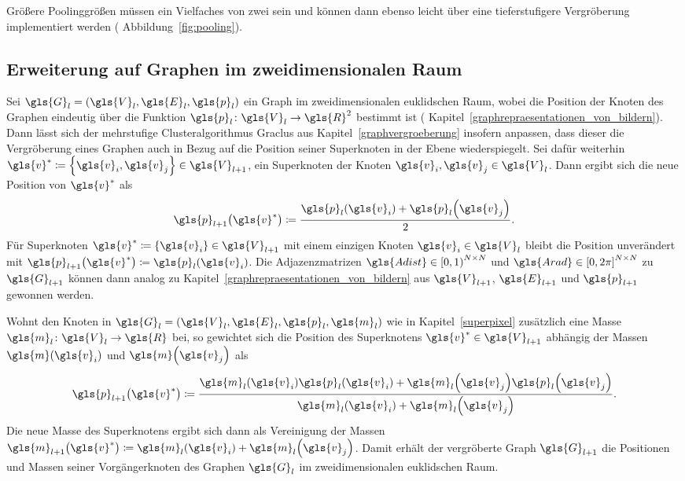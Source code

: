 Größere Poolinggrößen müssen ein Vielfaches von zwei sein und können dann ebenso leicht über eine tieferstufigere Vergröberung implementiert werden (\vgl{} Abbildung~\ref{fig:pooling}).

\subsection{Erweiterung auf Graphen im zweidimensionalen Raum}
\label{pooling_erweiterung}

Sei $\gls{G}_l = \left(\gls{V}_l, \gls{E}_l, \gls{p}_l\right)$ ein Graph im zweidimensionalen euklidschen Raum, wobei die Position der Knoten des Graphen eindeutig über die Funktion $\gls{p}_l \colon \gls{V}_l \to \gls{R}^2$ bestimmt ist (\vgl{} Kapitel~\ref{graphrepraesentationen_von_bildern}).
Dann lässt sich der mehrstufige Clusteralgorithmus Graclus aus Kapitel~\ref{graphvergroeberung} insofern anpassen, dass dieser die Vergröberung eines Graphen auch in Bezug auf die Position seiner Superknoten in der Ebene wiederspiegelt.
Sei dafür weiterhin $\gls{v}^* \coloneqq \left\{ \gls{v}_i, \gls{v}_j \right\} \in \gls{V}_{l+1}$, ein Superknoten der Knoten $\gls{v}_i, \gls{v}_j \in \gls{V}_l$.
Dann ergibt sich die neue Position von $\gls{v}^*$ als
\begin{equation*}
  \gls{p}_{l+1}\left(\gls{v}^*\right) \coloneqq \frac{\gls{p}_l\left(\gls{v}_i\right) + \gls{p}_l\left(\gls{v}_j\right)}{2}.
\end{equation*}
Für Superknoten $\gls{v}^* \coloneqq \left\{\gls{v}_i\right\} \in \gls{V}_{l+1}$ mit einem einzigen Knoten $\gls{v}_i \in \gls{V}_l$ bleibt die Position unverändert mit $\gls{p}_{l+1}\left(\gls{v}^*\right) \coloneqq \gls{p}_l\left(\gls{v}_i\right)$.
Die Adjazenzmatrizen $\gls{Adist} \in {\left[0, 1\right)}^{N \times N}$ und $\gls{Arad} \in {\left[0, 2\pi\right]}^{N \times N}$ zu $\gls{G}_{l+1}$ können dann analog zu Kapitel~\ref{graphrepraesentationen_von_bildern} aus $\gls{V}_{l+1}$, $\gls{E}_{l+1}$ und $\gls{p}_{l+1}$ gewonnen werden.

Wohnt den Knoten in $\gls{G}_l = \left(\gls{V}_l, \gls{E}_l, \gls{p}_l, \gls{m}_l\right)$ wie in Kapitel~\ref{superpixel} zusätzlich eine Masse $\gls{m}_l \colon \gls{V}_l \to \gls{R}$ bei, so gewichtet sich die Position des Superknotens $\gls{v}^* \in \gls{V}_{l+1}$ abhängig der Massen $\gls{m}\left(\gls{v}_i\right)$ und $\gls{m}\left(\gls{v}_j\right)$ als
\begin{equation*}
  \gls{p}_{l+1}\left(\gls{v}^*\right) \coloneqq \frac{\gls{m}_l\left(\gls{v}_i\right) \gls{p}_l\left(\gls{v}_i\right) + \gls{m}_l\left(\gls{v}_j\right) \gls{p}_l\left(\gls{v}_j\right)}{\gls{m}_l\left(\gls{v}_i\right) + \gls{m}_l\left(\gls{v}_j\right)}.
\end{equation*}
Die neue Masse des Superknotens ergibt sich dann als Vereinigung der Massen $\gls{m}_{l+1}\left(\gls{v}^*\right) \coloneqq \gls{m}_l\left(\gls{v}_i\right) + \gls{m}_l\left(\gls{v}_j\right)$.
Damit erhält der vergröberte Graph $\gls{G}_{l+1}$ die Positionen und Massen seiner Vorgängerknoten des Graphen $\gls{G}_l$ im zweidimensionalen euklidschen Raum.
